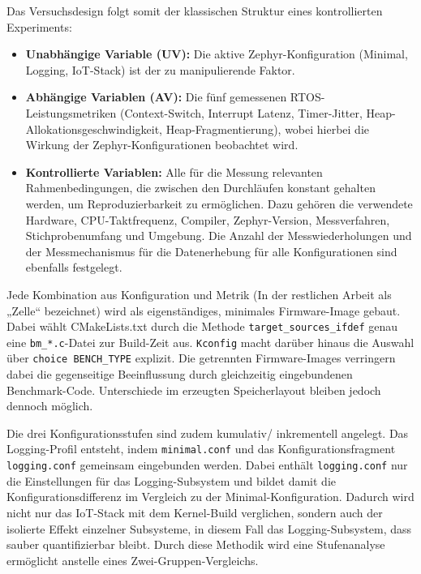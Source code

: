 Das Versuchsdesign folgt somit der klassischen Struktur eines kontrollierten Experiments:

\begin{itemize}
\item \textbf{Unabhängige Variable (UV):} Die aktive Zephyr-Konfiguration (Minimal, Logging, IoT-Stack) ist der zu manipulierende Faktor.
\item \textbf{Abhängige Variablen (AV):} Die fünf gemessenen RTOS-Leistungsmetriken (Context-Switch, Interrupt Latenz, Timer-Jitter, Heap-Allokationsgeschwindigkeit, Heap-Fragmentierung), wobei hierbei die Wirkung der Zephyr-Konfigurationen beobachtet wird.
\item \textbf{Kontrollierte Variablen:} Alle für die Messung relevanten Rahmenbedingungen, die zwischen den Durchläufen konstant gehalten werden, um Reproduzierbarkeit zu ermöglichen. Dazu gehören die verwendete Hardware, CPU-Taktfrequenz, Compiler, Zephyr-Version, Messverfahren, Stichprobenumfang und Umgebung. Die Anzahl der Messwiederholungen und der Messmechanismus für die Datenerhebung für alle Konfigurationen sind ebenfalls festgelegt.
\end{itemize}
Jede Kombination aus Konfiguration und Metrik (In der restlichen Arbeit als „Zelle“ bezeichnet) wird als eigenständiges, minimales Firmware-Image gebaut. Dabei wählt CMakeLists.txt durch die Methode \lstinline[style=fileinline]|target_sources_ifdef| genau eine \lstinline[style=fileinline]|bm_*.c|-Datei zur Build-Zeit aus. \lstinline[style=fileinline]|Kconfig| macht darüber hinaus die Auswahl über \lstinline[style=fileinline]|choice BENCH_TYPE| explizit. Die getrennten Firmware-Images verringern dabei die gegenseitige Beeinflussung durch gleichzeitig eingebundenen Benchmark-Code. Unterschiede im erzeugten Speicherlayout bleiben jedoch dennoch möglich.

Die drei Konfigurationsstufen sind zudem kumulativ/ inkrementell angelegt. Das Logging-Profil entsteht, indem \lstinline[style=fileinline]|minimal.conf| und das Konfigurationsfragment \lstinline[style=fileinline]|logging.conf| gemeinsam eingebunden werden. Dabei enthält \lstinline[style=fileinline]|logging.conf| nur die Einstellungen für das Logging-Subsystem und bildet damit die Konfigurationsdifferenz im Vergleich zu der Minimal-Konfiguration. Dadurch wird nicht nur das IoT-Stack mit dem Kernel-Build verglichen, sondern auch der isolierte Effekt einzelner Subsysteme, in diesem Fall das Logging-Subsystem, dass sauber quantifizierbar bleibt. Durch diese Methodik wird eine Stufenanalyse ermöglicht anstelle eines Zwei-Gruppen-Vergleichs.

